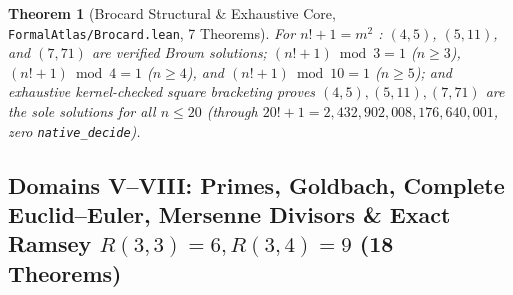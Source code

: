 \documentclass[11pt,reqno]{amsart}
\theoremstyle{plain}
\newtheorem{theorem}{Theorem}[section]
\theoremstyle{definition}
\newcommand{\code}[1]{{\upshape\nolinkurl{#1}}}
\begin{document}
\begin{theorem}[Brocard Structural \& Exhaustive Core, \code{FormalAtlas/Brocard.lean}, 7 Theorems]
For $n! + 1 = m^2$ \cite{overholt1993,berndtgalway2000}:
$(4,5)$, $(5,11)$, and $(7,71)$ are verified Brown solutions; $(n!+1)\bmod 3 = 1$ ($n \ge 3$),
$(n!+1)\bmod 4 = 1$ ($n \ge 4$), and $(n!+1)\bmod 10 = 1$ ($n \ge 5$); and exhaustive
kernel-checked square bracketing proves $(4,5),(5,11),(7,71)$ are the sole solutions for all
$n \le 20$ (through $20!+1 = 2{,}432{,}902{,}008{,}176{,}640{,}001$, zero \code{native_decide}).
\end{theorem}

\subsection{Domains V--VIII: Primes, Goldbach, Complete Euclid--Euler, Mersenne Divisors \& Exact Ramsey \texorpdfstring{$R(3,3)=6, R(3,4)=9$}{R(3,3)=6, R(3,4)=9} (18 Theorems)}
\end{document}
